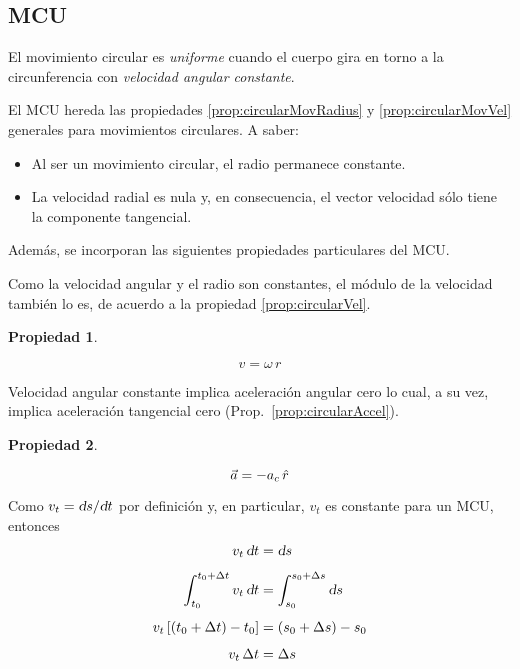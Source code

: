 \documentclass[a5paper,12pt,twoside]{book}
\newtheorem{prop}{{Propiedad}}[chapter]
\begin{document}
\subsection{MCU}
El movimiento circular es \emph{uniforme} cuando el cuerpo gira en torno a la circunferencia con \emph{velocidad angular constante}.

El MCU hereda las propiedades \ref{prop:circularMovRadius} y \ref{prop:circularMovVel} generales para movimientos circulares.
A saber:
\begin{itemize}
    \item Al ser un movimiento circular, el radio permanece constante.
    
    \item La velocidad radial es nula y, en consecuencia, el vector velocidad sólo tiene la componente tangencial.
\end{itemize}

Además, se incorporan las siguientes propiedades particulares del MCU.

Como la velocidad angular y el radio son constantes, el módulo de la velocidad también lo es, de acuerdo a la propiedad \ref{prop:circularVel}.

\begin{mdframed}[style=MyFrame1]
    \begin{prop}
    \end{prop}
    \begin{equation*}
        v = \omega \, r
    \end{equation*}
\end{mdframed}

Velocidad angular constante implica aceleración angular cero lo cual, a su vez, implica aceleración tangencial cero (Prop.~\ref{prop:circularAccel}).

\begin{mdframed}[style=MyFrame1]
    \begin{prop}
    \end{prop}
    \begin{equation*}
        \Vec{a} = - a_c \, \hat{r}
    \end{equation*}
\end{mdframed}

Como $v_t = \textsl{d} s / \textsl{d} t$ por definición y, en particular, $v_t$ es constante para un MCU, entonces
\begin{align*}
    v_t \, \textsl{d} t &= \textsl{d} s
    \\[1ex]
    \int_{t_0}^{t_0+\Delta t} v_t \, \textsl{d} t &= \int_{s_0}^{s_0+\Delta s} \textsl{d} s
    \\[1ex]
    v_t \left[\left( t_0+\Delta t \right) - t_0\right] &= \left( s_0+\Delta s \right) - s_0
    \\[1ex]
    v_t \, \Delta t &= \Delta s
\end{align*}
\end{document}
